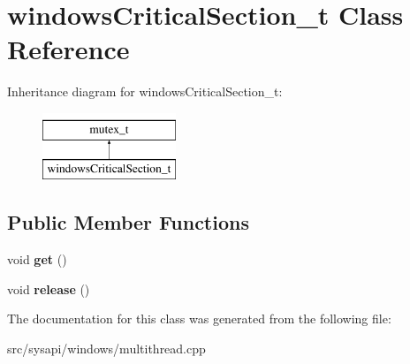 \hypertarget{classwindowsCriticalSection__t}{\section{windows\-Critical\-Section\-\_\-t \-Class \-Reference}
\label{classwindowsCriticalSection__t}
}
\-Inheritance diagram for windows\-Critical\-Section\-\_\-t\-:\begin{figure}[H]
\begin{center}
\leavevmode
\includegraphics[height=2.000000cm]{classwindowsCriticalSection__t}
\end{center}
\end{figure}
\subsection*{\-Public \-Member \-Functions}
\begin{DoxyCompactItemize}
\item 
\hypertarget{classwindowsCriticalSection__t_a93f9f3a833aa2e82ceecd64566013b18}{void {\bfseries get} ()}\label{classwindowsCriticalSection__t_a93f9f3a833aa2e82ceecd64566013b18}

\item 
\hypertarget{classwindowsCriticalSection__t_ae90553521ea6ab80330e5d3cd107d92d}{void {\bfseries release} ()}\label{classwindowsCriticalSection__t_ae90553521ea6ab80330e5d3cd107d92d}

\end{DoxyCompactItemize}


\-The documentation for this class was generated from the following file\-:\begin{DoxyCompactItemize}
\item 
src/sysapi/windows/multithread.\-cpp\end{DoxyCompactItemize}
